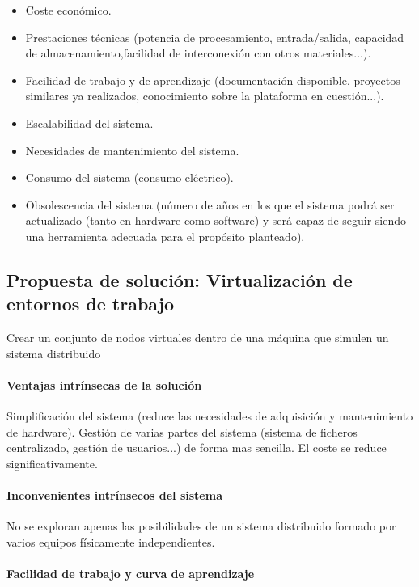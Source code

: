 \begin{itemize}
  \item Coste económico.
  \item Prestaciones técnicas (potencia de procesamiento, entrada/salida, capacidad de almacenamiento,facilidad de interconexión con otros materiales...).
  \item Facilidad de trabajo y de aprendizaje (documentación disponible, proyectos similares ya realizados, conocimiento sobre la plataforma en cuestión...).
  \item Escalabilidad del sistema.
  \item Necesidades de mantenimiento del sistema.
  \item Consumo del sistema (consumo eléctrico).
  \item Obsolescencia del sistema (número de años en los que el sistema podrá ser actualizado (tanto en hardware como software) y será capaz de seguir siendo una herramienta adecuada para el propósito planteado).

\end{itemize}

\subsection{Propuesta de solución: Virtualización de entornos de trabajo}

Crear un conjunto de nodos virtuales dentro de una máquina que simulen un sistema distribuido

\paragraph{Ventajas intrínsecas de la solución}

Simplificación del sistema (reduce las necesidades de adquisición y mantenimiento de hardware).
Gestión de varias partes del sistema (sistema de ficheros centralizado, gestión de usuarios...) de forma mas sencilla. El coste se reduce significativamente.

\paragraph{Inconvenientes intrínsecos del sistema}

No se exploran apenas las posibilidades de un sistema distribuido formado por varios equipos físicamente independientes.

\paragraph{Facilidad de trabajo y curva de aprendizaje}

